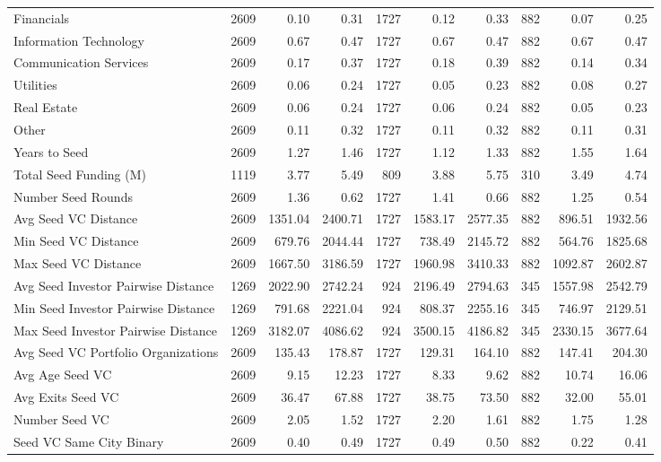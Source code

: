 {\begin{table}[!h]
{\begin{tabular}[t]{lrrrrrrrrr}
Financials & 2609 & 0.10 & 0.31 & 1727 & 0.12 & 0.33 & 882 & 0.07 & 0.25\\
Information Technology & 2609 & 0.67 & 0.47 & 1727 & 0.67 & 0.47 & 882 & 0.67 & 0.47\\
Communication Services & 2609 & 0.17 & 0.37 & 1727 & 0.18 & 0.39 & 882 & 0.14 & 0.34\\
Utilities & 2609 & 0.06 & 0.24 & 1727 & 0.05 & 0.23 & 882 & 0.08 & 0.27\\
\addlinespace
Real Estate & 2609 & 0.06 & 0.24 & 1727 & 0.06 & 0.24 & 882 & 0.05 & 0.23\\
Other & 2609 & 0.11 & 0.32 & 1727 & 0.11 & 0.32 & 882 & 0.11 & 0.31\\
Years to Seed & 2609 & 1.27 & 1.46 & 1727 & 1.12 & 1.33 & 882 & 1.55 & 1.64\\
Total Seed Funding (M) & 1119 & 3.77 & 5.49 & 809 & 3.88 & 5.75 & 310 & 3.49 & 4.74\\
Number Seed Rounds & 2609 & 1.36 & 0.62 & 1727 & 1.41 & 0.66 & 882 & 1.25 & 0.54\\
\addlinespace
Avg Seed VC Distance & 2609 & 1351.04 & 2400.71 & 1727 & 1583.17 & 2577.35 & 882 & 896.51 & 1932.56\\
Min Seed VC Distance & 2609 & 679.76 & 2044.44 & 1727 & 738.49 & 2145.72 & 882 & 564.76 & 1825.68\\
Max Seed VC Distance & 2609 & 1667.50 & 3186.59 & 1727 & 1960.98 & 3410.33 & 882 & 1092.87 & 2602.87\\
Avg Seed Investor Pairwise Distance & 1269 & 2022.90 & 2742.24 & 924 & 2196.49 & 2794.63 & 345 & 1557.98 & 2542.79\\
Min Seed Investor Pairwise Distance & 1269 & 791.68 & 2221.04 & 924 & 808.37 & 2255.16 & 345 & 746.97 & 2129.51\\
\addlinespace
Max Seed Investor Pairwise Distance & 1269 & 3182.07 & 4086.62 & 924 & 3500.15 & 4186.82 & 345 & 2330.15 & 3677.64\\
Avg Seed VC Portfolio Organizations & 2609 & 135.43 & 178.87 & 1727 & 129.31 & 164.10 & 882 & 147.41 & 204.30\\
Avg Age Seed VC & 2609 & 9.15 & 12.23 & 1727 & 8.33 & 9.62 & 882 & 10.74 & 16.06\\
Avg Exits Seed VC & 2609 & 36.47 & 67.88 & 1727 & 38.75 & 73.50 & 882 & 32.00 & 55.01\\
Number Seed VC & 2609 & 2.05 & 1.52 & 1727 & 2.20 & 1.61 & 882 & 1.75 & 1.28\\
\addlinespace
Seed VC Same City Binary & 2609 & 0.40 & 0.49 & 1727 & 0.49 & 0.50 & 882 & 0.22 & 0.41\\

\end{tabular}}
\end{table}}
